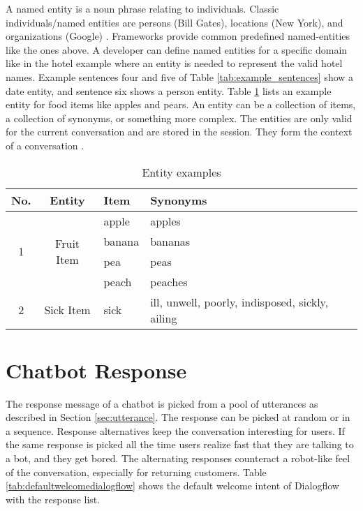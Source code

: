 A named entity is a noun phrase relating to individuals.
Classic individuals/named entities are persons (Bill Gates), locations (New York), and organizations (Google) \cite{geyer2016named}.
Frameworks provide common predefined named-entities like the ones above.
A developer can define named entities for a specific domain like in the hotel example where an entity is needed to represent the valid hotel names.
Example sentences four and five of Table \ref{tab:example_sentences} show a date entity, and sentence six shows a person entity.
Table \ref{tab:entityexampledialog} lists an example entity for food items like apples and pears.
An entity can be a collection of items, a collection of synonyms, or something more complex.
The entities are only valid for the current conversation and are stored in the session. 
They form the context of a conversation \cite{singhbuilding}.

\begin{table}[H]
    \centering
    \begin{tabular}{ c | c | l | l }
  No. & Entity & Item & Synonyms \\ \hline \hline
  \multirow{4}{*}{1} & \multirow{4}{*}{Fruit Item} & apple & apples \\
       & & banana & bananas\\
       & & pea & peas \\ 
       & & peach & peaches \\ \hline
    2 & Sick Item & sick & ill, unwell, poorly, indisposed, sickly, ailing \\
    \hline
\end{tabular}
    \caption{Entity examples} \label{tab:entityexampledialog}
\end{table} \noindent


\section{Chatbot Response} \label{sec:chatbot_response}
The response message of a chatbot is picked from a pool of utterances as described in Section \ref{sec:utterance}.
The response can be picked at random or in a sequence.
Response alternatives keep the conversation interesting for users.
If the same response is picked all the time users realize fast that they are 
talking to a bot, and they get bored. 
The alternating responses counteract a robot-like feel of the conversation, especially for returning customers. 
Table \ref{tab:defaultwelcomedialogflow} shows the default welcome intent of Dialogflow with the response list.


